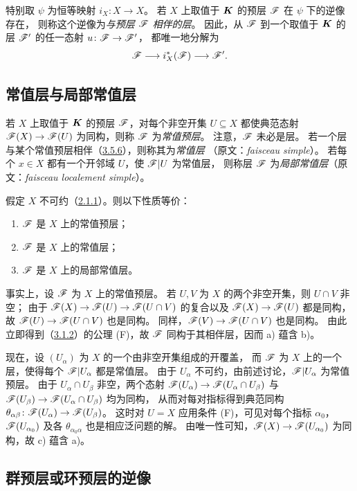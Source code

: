 特别取 $\psi$ 为恒等映射 $i_X\colon X\to X$。
若 $X$ 上取值于 $\boldsymbol K$ 的预层 $\mathscr F$ 在 $\psi$ 下的逆像存在，
则称这个逆像为\emph{与预层 $\mathscr F$ 相伴的层}。
因此，从 $\mathscr F$ 到一个取值于 $\boldsymbol K$ 的层 $\mathscr F'$ 的任一态射 $u\colon\mathscr F\to\mathscr F'$，
都唯一地分解为
\[
 \mathscr F\longrightarrow i_X^*(\mathscr F)\longrightarrow\mathscr F'.
\]

\subsection{常值层与局部常值层}\hypertarget{heading:0:3.6}{}

若 $X$ 上取值于 $\boldsymbol K$ 的预层 $\mathscr F$，对每个非空开集 $U\subseteq X$ 都使典范态射
$\mathscr F(X)\to\mathscr F(U)$ 为同构，则称 $\mathscr F$ 为\emph{常值预层}。
注意，$\mathscr F$ 未必是层。
若一个层与某个常值预层相伴（\hyperlink{para:0:3.5.6}{3.5.6}），则称其为\emph{常值层}
（原文：\textit{faisceau simple}）。
若每个 $x\in X$ 都有一个开邻域 $U$，使 $\mathscr F|U$ 为常值层，
则称层 $\mathscr F$ 为\emph{局部常值层}（原文：\textit{faisceau localement simple}）。

假定 $X$ 不可约（\hyperlink{para:0:2.1.1}{2.1.1}）。则以下性质等价：
\begin{enumerate}[label=\alph*)]
\item $\mathscr F$ 是 $X$ 上的常值预层；
\item $\mathscr F$ 是 $X$ 上的常值层；
\item $\mathscr F$ 是 $X$ 上的局部常值层。
\end{enumerate}
事实上，设 $\mathscr F$ 为 $X$ 上的常值预层。
若 $U,V$ 为 $X$ 的两个非空开集，则 $U\cap V$ 非空；
由于 $\mathscr F(X)\to\mathscr F(U)\to\mathscr F(U\cap V)$ 的复合以及 $\mathscr F(X)\to\mathscr F(U)$ 都是同构，
故 $\mathscr F(U)\to\mathscr F(U\cap V)$ 也是同构。
同样，$\mathscr F(V)\to\mathscr F(U\cap V)$ 也是同构。
由此立即得到（\hyperlink{para:0:3.1.2}{3.1.2}）的公理 (F)，故 $\mathscr F$ 同构于其相伴层，因而 a) 蕴含 b)。

现在，设 $(U_\alpha)$ 为 $X$ 的一个由非空开集组成的开覆盖，
而 $\mathscr F$ 为 $X$ 上的一个层，使得每个 $\mathscr F|U_\alpha$ 都是常值层。
由于 $U_\alpha$ 不可约，由前述讨论，$\mathscr F|U_\alpha$ 为常值预层。
由于 $U_\alpha\cap U_\beta$ 非空，两个态射
$\mathscr F(U_\alpha)\to\mathscr F(U_\alpha\cap U_\beta)$ 与
$\mathscr F(U_\beta)\to\mathscr F(U_\alpha\cap U_\beta)$ 均为同构，
从而对每对指标得到典范同构 $\theta_{\alpha\beta}\colon\mathscr F(U_\alpha)\to\mathscr F(U_\beta)$。
这时对 $U=X$ 应用条件 (F)，可见对每个指标 $\alpha_0$，
$\mathscr F(U_{\alpha_0})$ 及各 $\theta_{\alpha_0\alpha}$ 也是相应泛问题的解。
由唯一性可知，$\mathscr F(X)\to\mathscr F(U_{\alpha_0})$ 为同构，故 c) 蕴含 a)。

\subsection{群预层或环预层的逆像}\hypertarget{heading:0:3.7}{}

